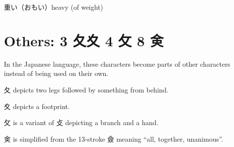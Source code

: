重い（おもい）heavy (of weight)

\section{Others: 3 夂夊 4 攵 8 㑒}

In the Japanese language,
these characters become parts of other characters
instead of being used on their own.

夂 depicts two legs followed by something from behind.

夊 depicts a footprint.

攵 is a variant of 攴 depicting a branch and a hand.

㑒 is simplified from the 13-stroke 僉
meaning ``all, together, unanimous''.
